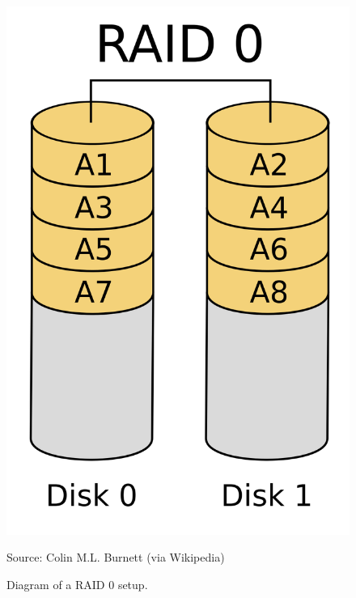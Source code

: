 \documentclass{report}
\newcommand{\source}[1]{\caption*{Source: {#1}} }
\begin{document}
\begin{figure}
  \centering
  \includegraphics[scale=0.1]{./assets/1024px-RAID_0.svg.png}
  \caption{Diagram of a RAID 0 setup.}
  \source{Colin M.L. Burnett (via Wikipedia)}
  \label{fig:raid0}
\end{figure}
\end{document}
